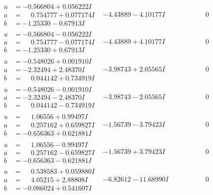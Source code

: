 \documentclass[1p]{elsarticle_modified}
\theoremstyle{definition}
\begin{document}
$$\begin{array}{c|c|c}
\begin{aligned}
u &= -0.566804 + 0.056222 I \\
a &= \phantom{-}0.754777 + 0.077174 I \\
b &= -1.25330 - 0.67913 I\end{aligned}
 & -4.43889 - 4.10177 I & \phantom{-0.000000 } 0 \\ \hline\begin{aligned}
u &= -0.566804 - 0.056222 I \\
a &= \phantom{-}0.754777 - 0.077174 I \\
b &= -1.25330 + 0.67913 I\end{aligned}
 & -4.43889 + 4.10177 I & \phantom{-0.000000 } 0 \\ \hline\begin{aligned}
u &= -0.548026 + 0.001910 I \\
a &= -2.32494 + 2.48370 I \\
b &= \phantom{-}0.044142 + 0.734919 I\end{aligned}
 & -3.98743 + 2.05565 I & \phantom{-0.000000 } 0 \\ \hline\begin{aligned}
u &= -0.548026 - 0.001910 I \\
a &= -2.32494 - 2.48370 I \\
b &= \phantom{-}0.044142 - 0.734919 I\end{aligned}
 & -3.98743 - 2.05565 I & \phantom{-0.000000 } 0 \\ \hline\begin{aligned}
u &= \phantom{-}1.06556 + 0.99497 I \\
a &= \phantom{-}0.257162 + 0.659827 I \\
b &= -0.656363 + 0.621881 I\end{aligned}
 & -1.56739 - 3.79423 I & \phantom{-0.000000 } 0 \\ \hline\begin{aligned}
u &= \phantom{-}1.06556 - 0.99497 I \\
a &= \phantom{-}0.257162 - 0.659827 I \\
b &= -0.656363 - 0.621881 I\end{aligned}
 & -1.56739 + 3.79423 I & \phantom{-0.000000 } 0 \\ \hline\begin{aligned}
u &= \phantom{-}0.538583 + 0.059880 I \\
a &= \phantom{-}4.05215 + 2.88808 I \\
b &= -0.086024 + 0.541607 I\end{aligned}
 & -6.82612 - 11.68990 I & \phantom{-0.000000 } 0\\

\end{array}$$
\end{document}
